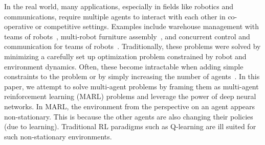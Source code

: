 \documentclass{article}
\begin{document}
In the real world, many applications, especially in fields like robotics and communications, require multiple agents to interact with each other in co-operative or competitive settings. Examples include warehouse management with teams of robots~\cite{enright2011optimization}, multi-robot furniture assembly~\cite{knepper2013ikeabot}, and concurrent control and communication for teams of robots~\cite{2017Transactions_Stephan}. Traditionally, these problems were solved by minimizing a carefully set up optimization problem constrained by robot and environment dynamics. Often, these become intractable when adding simple constraints to the problem or by simply increasing the number of agents~\cite{solovey2016hardness}. In this paper, we attempt to solve multi-agent problems by framing them as multi-agent reinforcement learning (MARL) problems and leverage the power of deep neural networks. In MARL, the environment from the perspective on an agent appears non-stationary. This is because the other agents are also changing their policies (due to learning). Traditional RL paradigms such as Q-learning are ill suited for such non-stationary environments. 
\end{document}
